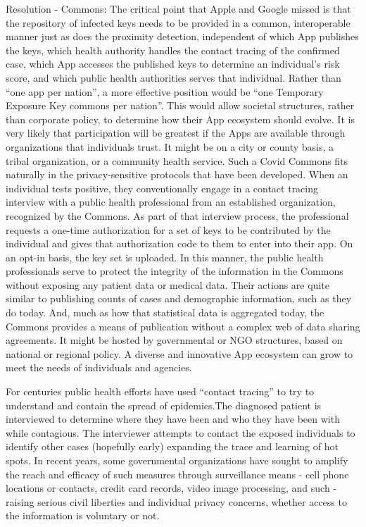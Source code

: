 Resolution - Commons: The critical point that Apple and Google missed is that the repository of infected keys needs to be provided in a common, interoperable manner just as does the proximity detection, independent of which App publishes the keys, which health authority handles the contact tracing of the confirmed case, which App accesses the published keys to determine an individual’s risk score, and which public health authorities serves that individual.
Rather than “one app per nation”, a more effective position would be “one Temporary Exposure Key commons per nation”.  This would allow societal structures, rather than corporate policy, to determine how their App ecosystem should evolve.
It is very likely that participation will be greatest if the Apps are available through organizations that individuals trust.  It might be on a city or county basis, a tribal organization, or a community health service.
Such a Covid Commons fits naturally in the privacy-sensitive protocols that have been developed.
When an individual tests positive, they conventionally engage in a contact tracing interview with a public health professional from an established organization, recognized by the Commons.
As part of that interview process, the professional requests a one-time authorization for a set of keys to be contributed by the individual and gives that authorization code to them to enter into their app.
On an opt-in basis, the key set is uploaded.
In this manner, the public health professionals serve to protect the integrity of the information in the Commons without exposing any patient data or medical data.
Their actions are quite similar to publishing counts of cases and demographic information, such as they do today.
And, much as how that statistical data is aggregated today, the Commons provides a means of publication without a complex web of data sharing agreements.
It might be hosted by governmental or NGO structures, based on national or regional policy.
A diverse and innovative App ecosystem can grow to meet the needs of individuals and agencies.
\fi


For centuries public health efforts have used “contact tracing” to try to understand and contain the spread of epidemics.The diagnosed patient is interviewed to determine where they have been and who they have been with while contagious.
The interviewer attempts to contact the exposed individuals to identify other cases (hopefully early) expanding the trace and learning of hot spots.
In recent years, some governmental organizations have sought to amplify the reach and efficacy of such measures through surveillance means - cell phone locations or contacts, credit card records, video image processing, and such - raising serious civil liberties and individual privacy concerns, whether access to the information is voluntary or not.

